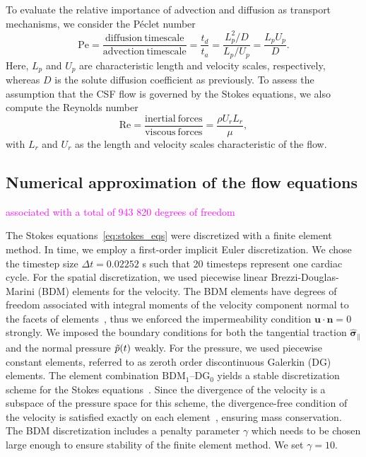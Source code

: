 \documentclass[fleqn]{wlscirep}
\newcommand{\nn}{\mathbf{n}}
\newcommand{\uu}{\mathbf{u}}
\newcommand{\bsig}{\bm{\sigma}}
\newcommand{\bsigpar}{\hat{\bsig}_{\parallel}}
\newcommand{\mer}[1]{\textcolor{magenta}{#1}}
\begin{document}
To evaluate the relative importance of advection and diffusion as transport mechanisms, we consider the Péclet number
\begin{equation*}
    \mathrm{Pe} = \frac{\mathrm{diffusion \ timescale}}{\mathrm{advection \ timescale}} = \frac{t_d}{t_a} = \frac{L_p^2/D}{L_p/U_p} = \frac{L_p U_p}{D}.
\end{equation*}
Here, $L_p$ and $U_p$ are characteristic length and velocity scales, respectively, whereas $D$ is the solute diffusion coefficient as previously. To assess the assumption that the CSF flow is governed by the Stokes equations, we also compute the Reynolds number
\begin{equation*}
    \mathrm{Re} = \frac{\mathrm{inertial \ forces}}{\mathrm{viscous \ forces}} = \frac{\rho U_r L_r}{\mu},
\end{equation*}
with $L_r$ and $U_r$ as the length and velocity scales characteristic of the flow. 

\subsection*{Numerical approximation of the flow equations}


\mer{associated with a total of 943 820 degrees of freedom}

The Stokes equations~\eqref{eq:stokes_eqs} were discretized with a finite element method. In time, we employ a first-order implicit Euler discretization. We chose the timestep size $\Delta t = 0.02252$ s such that 20 timesteps represent one cardiac cycle. For the spatial discretization, we used piecewise linear Brezzi-Douglas-Marini (BDM) elements for the velocity. The BDM elements have degrees of freedom associated with integral moments of the velocity component normal to the facets of elements~\cite{Brezzi1985TwoProblems}, thus we enforced the impermeability condition $\uu\cdot\nn=0$ strongly. We imposed the boundary conditions for both the tangential traction $\bsigpar$ and the normal pressure $\Tilde{p}(t)$ weakly. For the pressure, we used piecewise constant elements, referred to as zeroth order discontinuous Galerkin (DG) elements. The element combination $\mathrm{BDM}_1$--$\mathrm{DG}_{0}$ yields a stable discretization scheme for the Stokes equations~\cite{Stenberg1989SomeEquations}. Since the divergence of the velocity is a subspace of the pressure space for this scheme, the divergence-free condition of the velocity is satisfied exactly on each element~\cite{Boffi2008FiniteProblem}, ensuring mass conservation. The BDM discretization includes a penalty parameter $\gamma$ which needs to be chosen large enough to ensure stability of the finite element method. We set $\gamma=10.$
\end{document}
